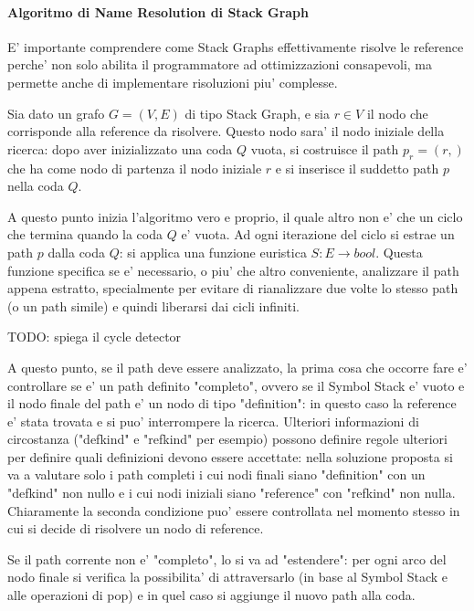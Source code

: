 \paragraph{Algoritmo di Name Resolution di Stack Graph}

E' importante comprendere come Stack Graphs effettivamente risolve le reference perche' non solo abilita il programmatore ad ottimizzazioni consapevoli, ma permette anche di implementare risoluzioni piu' complesse.

Sia dato un grafo $G = (V, E)$ di tipo Stack Graph, e sia $r \in V$ il nodo che corrisponde alla reference da risolvere. Questo nodo sara' il nodo iniziale della ricerca: dopo aver inizializzato una coda $Q$ vuota, si costruisce il path $p_r = (r,)$ che ha come nodo di partenza il nodo iniziale $r$ e si inserisce il suddetto path $p$ nella coda $Q$.

A questo punto inizia l'algoritmo vero e proprio, il quale altro non e' che un ciclo che termina quando la coda $Q$ e' vuota.
Ad ogni iterazione del ciclo si estrae un path $p$ dalla coda $Q$: si applica una funzione euristica $S : E \rightarrow bool$.
Questa funzione specifica se e' necessario, o piu' che altro conveniente, analizzare il path appena estratto, specialmente per evitare di rianalizzare due volte lo stesso path (o un path simile) e quindi liberarsi dai cicli infiniti.

TODO: spiega il cycle detector

A questo punto, se il path deve essere analizzato, la prima cosa che occorre fare e' controllare se e' un path definito "completo", ovvero se il Symbol Stack e' vuoto e il nodo finale del path e' un nodo di tipo "definition": in questo caso la reference e' stata trovata e si puo' interrompere la ricerca.
Ulteriori informazioni di circostanza ("defkind" e "refkind" per esempio) possono definire regole ulteriori per definire quali definizioni devono essere accettate: nella soluzione proposta si va a valutare solo i path completi i cui nodi finali siano "definition" con un "defkind" non nullo e i cui nodi iniziali siano "reference" con "refkind" non nulla. Chiaramente la seconda condizione puo' essere controllata nel momento stesso in cui si decide di risolvere un nodo di reference.

Se il path corrente non e' "completo", lo si va ad "estendere": per ogni arco del nodo finale si verifica la possibilita' di attraversarlo (in base al Symbol Stack e alle operazioni di pop) e in quel caso si aggiunge il nuovo path alla coda.


